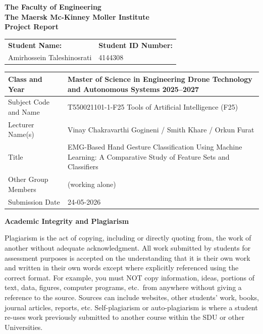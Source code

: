 \documentclass[11pt,a4paper]{article}
\begin{document}
\begin{titlepage}
\centering
\vspace*{1.5cm}
{\large\textbf{The Faculty of Engineering}\\[0.3cm]
\textbf{The Maersk Mc-Kinney Moller Institute}\\[0.3cm]
\textbf{Project Report}}

\vspace{1.5cm}

\begin{tabular}{|p{7.5cm}|p{7.5cm}|}
\hline
\textbf{Student Name:} & \textbf{Student ID Number:} \\[0.4cm]
Amirhossein Taleshinosrati & 4144308 \\[0.3cm]
\hline
\end{tabular}

\vspace{0.8cm}

\begin{tabular}{|p{4.2cm}|p{10.8cm}|}
\hline
Class and Year         & Master of Science in Engineering Drone Technology and Autonomous Systems 2025--2027 \\
\hline
Subject Code and Name  & T550021101-1-F25 Tools of Artificial Intelligence (F25) \\
\hline
Lecturer Name(s)       & Vinay Chakravarthi Gogineni / Smith Khare / Orkun Furat \\
\hline
Title                  & EMG-Based Hand Gesture Classification Using Machine Learning: A Comparative Study of Feature Sets and Classifiers \\
\hline
Other Group Members    & (working alone) \\
\hline
Submission Date        & 24-05-2026 \\
\hline
\end{tabular}

\vspace{1.5cm}

\begin{flushleft}
\textbf{Academic Integrity and Plagiarism}

\vspace{0.3cm}
{\small Plagiarism is the act of copying, including or directly quoting from, the work of another without
adequate acknowledgment. All work submitted by students for assessment purposes is accepted on the
understanding that it is their own work and written in their own words except where explicitly referenced
using the correct format. For example, you must NOT copy information, ideas, portions of text, data,
figures, computer programs, etc.\ from anywhere without giving a reference to the source. Sources can
include websites, other students' work, books, journal articles, reports, etc. Self-plagiarism or
auto-plagiarism is where a student re-uses work previously submitted to another course within the SDU
or other Universities.

}
\end{flushleft}
\end{titlepage}
\end{document}
